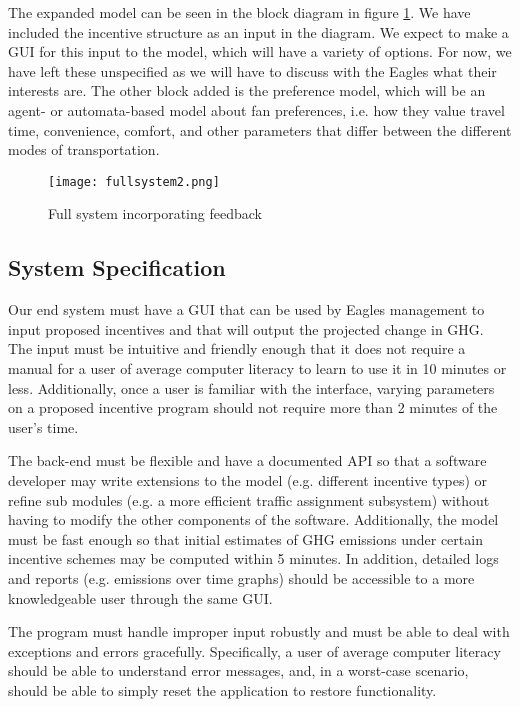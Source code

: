 \documentclass[12pt]{article}
\begin{document}
The expanded model can be seen in the block diagram in figure
\ref{mainsystem2}. We have included the incentive structure as an
input in the diagram. We expect to make a GUI for this input to the
model, which will have a variety of options. For now, we have left
these unspecified as we will have to discuss with the Eagles what
their interests are. The other block added is the preference model,
which will be an agent- or automata-based model about fan preferences,
i.e. how they value travel time, convenience, comfort, and other
parameters that differ between the different modes of transportation.

\begin{figure}[htp]
  \centering
  \texttt{[image: fullsystem2.png]}
  \caption{Full system incorporating feedback}
  \label{mainsystem2}
\end{figure}

\subsection{System Specification}
Our end system must have a GUI that can be used by Eagles management
to input proposed incentives and that will output the projected change
in GHG. The input must be intuitive and friendly enough that it does
not require a manual for a user of average computer literacy to learn
to use it in 10 minutes or less. Additionally, once a user is familiar
with the interface, varying parameters on a proposed incentive program
should not require more than 2 minutes of the user's time.

The back-end must be flexible and have a documented API so that a
software developer may write extensions to the model (e.g. different
incentive types) or refine sub modules (e.g. a more efficient traffic
assignment subsystem) without having to modify the other components of
the software. Additionally, the model must be fast enough so that
initial estimates of GHG emissions under certain incentive schemes may
be computed within 5 minutes. In addition, detailed logs and reports
(e.g. emissions over time graphs) should be accessible to a more
knowledgeable user through the same GUI.

The program must handle improper input robustly and must be able to
deal with exceptions and errors gracefully. Specifically, a user of
average computer literacy should be able to understand error messages,
and, in a worst-case scenario, should be able to simply reset the
application to restore functionality.
\end{document}

